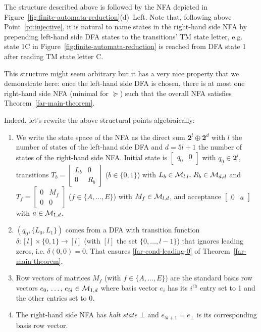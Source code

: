 \begin{example}\normalfont
  The structure described above is followed by the NFA depicted in Figure~\ref{fig:finite-automata-reduction}(d)~Left. Note that, following above Point~\ref{pt:injective}, it is natural to name states in the right-hand side NFA by prepending left-hand side DFA states to the transitions' TM state letter, e.g. state 1C in Figure~\ref{fig:finite-automata-reduction} is reached from DFA state 1 after reading TM state letter C.
\end{example}

This structure might seem arbitrary but it has a very nice property that we demonstrate here: once the left-hand side DFA is chosen, there is at most one right-hand side NFA (minimal for $\succeq$) such that the overall NFA satisfies Theorem~\ref{far-main-theorem}.



Indeed, let's rewrite the above structural points algebraically:


\begin{enumerate}
  \item We write the state space of the NFA as the direct sum $\mathbf{2}^l \oplus \mathbf{2}^d$ with $l$ the number of states of the left-hand side DFA and $d=5l+1$ the number of states of the right-hand side NFA. Initial state is $\begin{bmatrix}q_0&0\end{bmatrix}$ with $q_0 \in \mathbf{2}^l$,
        transitions
        $T_b=\begin{bmatrix}L_b&0\\0&R_b\end{bmatrix}$ ($b\in\{0,1\}$) with $L_b \in \mathcal{M}_{l,l},\, R_b \in \mathcal{M}_{d,d}$ and
        $T_f=\begin{bmatrix}0&M_f\\0&0\end{bmatrix}$ ($f\in\{A,\ldots,E\}$) with $M_f \in \mathcal{M}_{l,d}$,
        and acceptance $\begin{bmatrix}0&a\end{bmatrix}$ with $a \in \mathcal{M}_{1,d}$.
  \item $(q_0,\{L_0, L_1\})$ comes from a DFA with transition function $\delta: [l] \times \{0,1\} \to [l]$ (with $[l]$ the set $\{0,\dots,l-1\}$) that ignores leading zeros, i.e. $\delta(0,0) = 0$. That ensures \eqref{far-cond-leading-0} of Theorem~\ref{far-main-theorem}.
  \item Row vectors of matrices $M_f$ (with $f\in\{A,\ldots,E\}$) are the standard basis row vectors $e_0,\, \dots,\, e_{5l} \in \mathcal{M}_{1,d}$ where basis vector $e_i$ has its $i^\text{th}$ entry set to 1 and the other entries set to 0.\label{pt:basis}
  \item The right-hand side NFA has \textit{halt state} $\bot$ and $e_{5l+1} = e_\bot$ is its corresponding basis row vector.

\end{enumerate}


